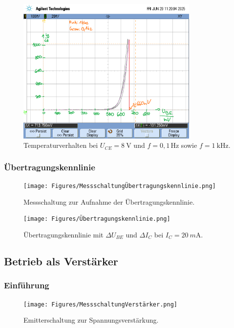 \documentclass[
	a4paper, %
	12pt, %
]{CSUniSchoolLabReport}
\newcommand{\milli}{m}
\begin{document}
\begin{figure}[H]
	\centering
	\includegraphics[width=0.8\textwidth]{Figures/8V1khz0.1hzzusammentemp.png}
	\caption{Temperaturverhalten bei $U_{CE} = \SI{8}{\volt}$ und $f = 0{,}1\,\mathrm{Hz}$ sowie $f = \SI{1}{\kilo\hertz}$.}
	\label{fig:8V1khz0.1hzzusammentemp}
\end{figure}

\subsubsection{Übertragungskennlinie}
\begin{figure}[H]
	\centering
	\texttt{[image: Figures/MessschaltungÜbertragungskennlinie.png]}
	\caption{Messschaltung zur Aufnahme der Übertragungskennlinie.}
	\label{fig:MessschaltungÜbertragungskennlinie}
\end{figure}
\begin{figure}[H]
	\centering
	\texttt{[image: Figures/Übertragungskennlinie.png]}
	\caption{Übertragungskennlinie mit $\Delta U_{BE}$ und $\Delta I_C$ bei $I_C = \SI{20}{\milli\ampere}$.}
	\label{fig:Übertragungskennlinie}
\end{figure}

\subsection{Betrieb als Verstärker}
\subsubsection{Einführung}
\begin{figure}[h]
	\centering
	\texttt{[image: Figures/MessschaltungVerstärker.png]}
	\caption{Emitterschaltung zur Spannungsverstärkung.}
	\label{fig:MessschaltungVerstärker}
\end{figure}
\end{document}
